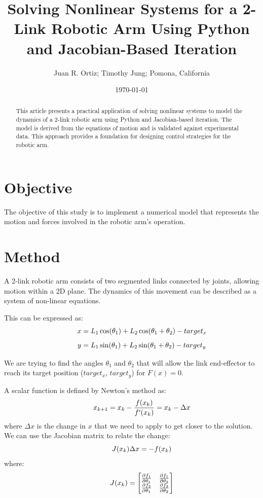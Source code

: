 \documentclass[letterpaper,twocolumn,fleqn]{article}
\title{ Solving Nonlinear Systems for a 2-Link Robotic Arm Using Python and Jacobian-Based Iteration}
\author{ Juan R. Ortiz; Timothy Jung; Pomona, California}
\date{\today} %
\begin{document}
 
\maketitle 
\thispagestyle{empty} %


\begin{abstract}
This article presents a practical application of solving nonlinear systems to model the dynamics of a 2-link robotic arm using Python and Jacobian-based iteration. The model is derived from the equations of motion and is validated against experimental data. This approach provides a foundation for designing control strategies for the robotic arm.
\end{abstract}

\section{Objective}
\label{sec:intro}
The objective of this study is to implement a numerical model that represents the motion and forces involved in the robotic arm's operation. 
\vspace{0.1in}

\section{Method}
A 2-link robotic arm consists of two segmented links connected by joints, allowing motion within a 2D plane. The dynamics of this movement can be described as a system of non-linear equations. 
\vspace{0.1in}

\noindent This can be expressed as:
\[\hspace{0.4in}
x = L_1\cos(\theta_1) + L_2\cos(\theta_1 + \theta_2) - target_x
\]
\[\hspace{0.4in}
y = L_1\sin(\theta_1) + L_2\sin(\theta_1 + \theta_2) - target_y
\]
\vspace{0.1in}

\noindent We are trying to find the angles $\theta_1$ and $\theta_2$ that will allow the link end-effector to reach its target position ($target_x$, $target_y$) for $F(x) = 0$.
\vspace{0.1in}

\noindent A scalar function is defined by Newton's method as:
\[\hspace{0.4in}x_{k+1} = x_k - \frac{f(x_k)}{f'(x_k)} = x_k - \Delta x\]
\noindent where $\Delta x$ is the change in $x$ that we need to apply to get closer to the solution. We can use the Jacobian matrix to relate the change:
\[\hspace{0.4in}J(x_k) \Delta x = -f(x_k)\]
\noindent where:
\[\hspace{0.4in}J(x_k) = 
\begin{bmatrix}
\frac{\partial f_1}{\partial \theta_1} & \frac{\partial f_1}{\partial \theta_2} \\
\frac{\partial f_2}{\partial \theta_1} & \frac{\partial f_2}{\partial \theta_2}
\end{bmatrix}
\]
\end{document}
